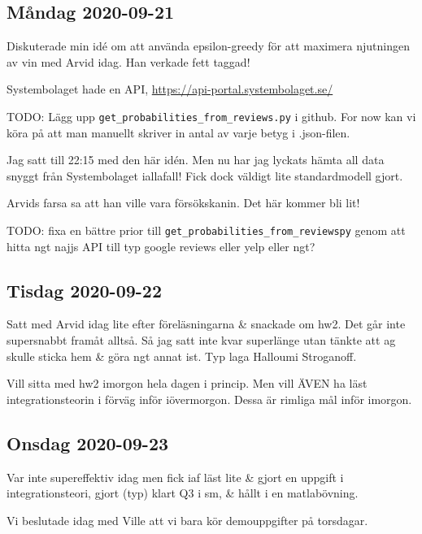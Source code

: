 \subsection{Måndag 2020-09-21}

Diskuterade min idé om att använda epsilon-greedy för att maximera njutningen av vin med Arvid idag. Han verkade fett taggad!

Systembolaget hade en API, \url{https://api-portal.systembolaget.se/}

TODO: Lägg upp \verb|get_probabilities_from_reviews.py| i github. For now kan vi köra på att man manuellt skriver in antal av varje betyg i .json-filen. \checkmark

Jag satt till 22:15 med den här idén. Men nu har jag lyckats hämta all data snyggt från Systembolaget iallafall! Fick dock väldigt lite standardmodell gjort.

Arvids farsa sa att han ville vara försökskanin. Det här kommer bli lit!

\bigskip

TODO: fixa en bättre prior till \verb|get_probabilities_from_reviewspy| genom att hitta ngt najjs API till typ google reviews eller yelp eller ngt?


\subsection{Tisdag 2020-09-22}

Satt med Arvid idag lite efter föreläsningarna \& snackade om hw2. Det går inte supersnabbt framåt alltså. Så jag satt inte kvar superlänge utan tänkte att ag skulle sticka hem \& göra ngt annat ist. Typ laga Halloumi Stroganoff.

Vill sitta med hw2 imorgon hela dagen i princip. Men vill ÄVEN ha läst integrationsteorin i förväg inför iövermorgon. Dessa är rimliga mål inför imorgon.


\subsection{Onsdag 2020-09-23}

Var inte supereffektiv idag men fick iaf läst lite \& gjort en uppgift i integrationsteori, gjort (typ) klart Q3 i sm, \& hållt i en matlabövning.

Vi beslutade idag med Ville att vi bara kör demouppgifter på torsdagar.

\bigskip

